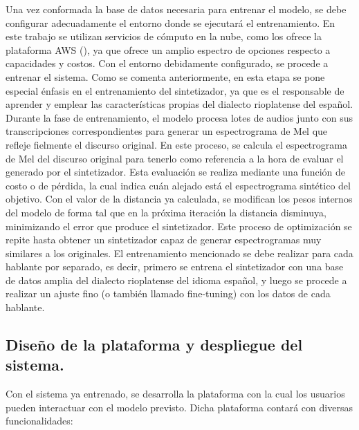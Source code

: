 Una vez conformada la base de datos necesaria para entrenar el modelo, se debe configurar adecuadamente el entorno donde se ejecutará el entrenamiento. En este trabajo se utilizan servicios de cómputo en la nube, como los ofrece la plataforma AWS (\cite{amazonwebservices}), ya que ofrece un amplio espectro de opciones respecto a capacidades y costos. Con el entorno debidamente configurado, se procede a entrenar el sistema.
Como se comenta anteriormente, en esta etapa se pone especial énfasis en el entrenamiento del sintetizador, ya que es el responsable de aprender y emplear las características propias del dialecto rioplatense del español. Durante la fase de entrenamiento, el modelo procesa lotes de audios junto con sus transcripciones correspondientes para generar un espectrograma de Mel que refleje fielmente el discurso original. En este proceso, se calcula el espectrograma de Mel del discurso original para tenerlo como referencia a la hora de evaluar el generado por el sintetizador. Esta evaluación se realiza mediante una función de costo o de pérdida, la cual indica cuán alejado está el espectrograma sintético del objetivo. Con el valor de la distancia ya calculada, se modifican los pesos internos del modelo de forma tal que en la próxima iteración la distancia disminuya, minimizando el error que produce el sintetizador. Este proceso de optimización se repite hasta obtener un sintetizador capaz de generar espectrogramas muy similares a los originales. El entrenamiento mencionado se debe realizar para cada hablante por separado, es decir, primero se entrena el sintetizador con una base de datos amplia del dialecto rioplatense del idioma español, y luego se procede a realizar un ajuste fino (o también llamado fine-tuning) con los datos de cada hablante.

\subsection{Diseño de la plataforma y despliegue del sistema.}

Con el sistema ya entrenado, se desarrolla la plataforma con la cual los usuarios pueden interactuar con el modelo previsto. Dicha plataforma contará con diversas funcionalidades:

